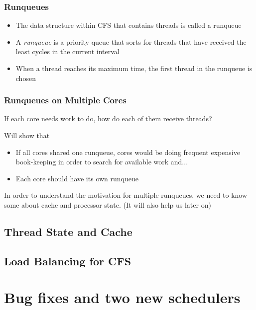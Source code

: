 \documentclass{beamer}
\newcommand{\linespace}{\vskip 0.25cm}
\begin{document}
\begin{frame}
\frametitle{Runqueues}

\begin{itemize}
	\item The data structure within CFS that contains threads is called a runqueue
	\item A \emph{runqueue} is a priority queue that sorts for threads that have received the least cycles in the current interval
	\item When a thread reaches its maximum time, the first thread in the runqueue is chosen	
\end{itemize}

\end{frame}


\begin{frame}
\frametitle{Runqueues on Multiple Cores}
If each core needs work to do, how do each of them receive threads?

\linespace

Will show that
\begin{itemize}
	\item If all cores shared one runqueue, cores would be doing frequent expensive book-keeping in order to search for available work and...
	\item Each core should have its own runqueue
\end{itemize}

\linespace

In order to understand the motivation for multiple runqueues, we need to know some about cache and processor state. (It will also help us later on)

\end{frame}



\subsection[Cache]{Thread State and Cache}
\begin{frame}
\end{frame}
\subsection[Load Balancing]{Load Balancing for CFS}
\begin{frame}
\end{frame}
\section[Bug Fixes and New Schedulers]{Bug fixes and two new schedulers}
\begin{frame}
\end{frame}
\end{document}

